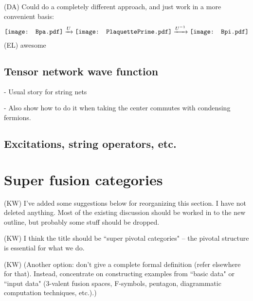 \documentclass[12pt,a4paper]{article}
\newcounter{arrow}
\newcommand{\dave}[1]{{\color{ao(english)}\footnotesize{(DA) #1}}}
\newcommand{\ethan}[1]{{\color{amethyst}\footnotesize{(EL) #1}}}
\newcommand{\kw}[1]{{\color{kwcolor}\footnotesize{(KW) #1}}}
\newcommand{\Bpa}{\mathord{\vcenter{\hbox{\texttt{[image: Bpa.pdf]}}}}}
\newcommand{\Bpi}{\mathord{\vcenter{\hbox{\texttt{[image: Bpi.pdf]}}}}}
\newcommand{\PlaquettePrime}{\mathord{\vcenter{\hbox{\texttt{[image: PlaquettePrime.pdf]}}}}}
\begin{document}
 \dave{Could do a completely different approach, and just work in a more convenient basis:}
 \begin{align}
\Bpa \xrightarrow{U} \PlaquettePrime \xrightarrow{U^{-1}} \Bpi
 \end{align}
 \ethan{awesome} 
 
\subsection{Tensor network wave function}
- Usual story for string nets

- Also show how to do it when taking the center commutes with condensing fermions. 

\subsection{Excitations, string operators, etc.}
 
 
\section{Super fusion categories}

\kw{I've added some suggestions below for reorganizing this section.
I have not deleted anything.
Most of the existing discussion should be worked in to the new outline, but probably some stuff should be dropped.}

\kw{I think the title should be ``super pivotal categories" -- the pivotal structure is essential for what we do.}

\kw{(Another option: don't give a complete formal definition (refer elsewhere for that).  
Instead, concentrate on constructing examples from ``basic data" or ``input data" (3-valent fusion spaces, F-symbols, pentagon, 
diagrammatic computation techniques, etc.).)}
\end{document}
